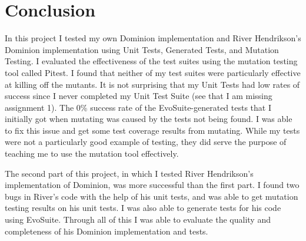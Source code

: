 \documentclass[letterpaper,10pt]{article}
\begin{document}
\section{Conclusion}
In this project I tested my own Dominion implementation and River Hendrikson's Dominion 
implementation using Unit Tests, Generated Tests, and Mutation Testing. I evaluated the 
effectiveness of the test suites using the mutation testing tool called Pitest. I found that 
neither of my test suites were particularly effective at killing off the mutants. It is not 
surprising that my Unit Tests had low rates of success since I never completed my Unit Test Suite 
(see that I am missing assignment 1). The 0\% success rate of the EvoSuite-generated tests that I 
initially got when mutating was caused by the tests not being found. I was able to fix this issue 
and get some test coverage results from mutating. While my tests were not a particularly good 
example of testing, they did serve the purpose of teaching me to use the mutation tool 
effectively.

The second part of this project, in which I tested River Hendrikson's implementation of Dominion, 
was more successful than the first part. I found two bugs in River's code with the help of his 
unit tests, and was able to get mutation testing results on his unit tests. I was also able to 
generate tests for his code using EvoSuite. Through all of this I was able to evaluate the 
quality and completeness of his Dominion implementation and tests.
\end{document}
